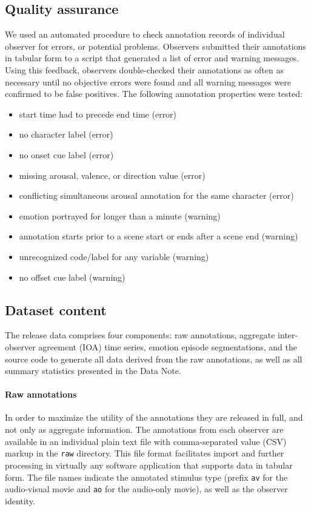 \subsection*{Quality assurance}

We used an automated procedure to check annotation records of individual
observer for errors, or potential problems. Observers submitted their
annotations in tabular form to a script that generated a list of error and
warning messages. Using this feedback, observers double-checked their
annotations as often as necessary until no objective errors were found and
all warning messages were confirmed to be false positives. The following
annotation properties were tested:

\begin{itemize}
  \item start time had to precede end time (error)
  \item no character label (error)
  \item no onset cue label (error)
  \item missing arousal, valence, or direction value (error)
  \item conflicting simultaneous arousal annotation for the same character (error)
  \item emotion portrayed for longer than a minute (warning)
  \item annotation starts prior to a scene start or ends after a scene end
    (warning)
  \item unrecognized code/label for any variable (warning)
  \item no offset cue label (warning)
\end{itemize}

\subsection*{Dataset content}

The release data comprises four components: raw annotations, aggregate
inter-observer agreement (IOA) time series, emotion episode segmentations, and
the source code to generate all data derived from the raw annotations, as well
as all summary statistics presented in the Data Note.

\paragraph{Raw annotations} In order to maximize the utility of the annotations
they are released in full, and not only as aggregate information. The
annotations from each observer are available in an individual plain text file
with comma-separated value (CSV) markup in the \texttt{raw} directory. This
file format facilitates import and further processing in virtually any software
application that supports data in tabular form. The file names indicate the
annotated stimulus type (prefix \texttt{av} for the audio-visual movie and
\texttt{ao} for the audio-only movie), as well as the observer identity.

